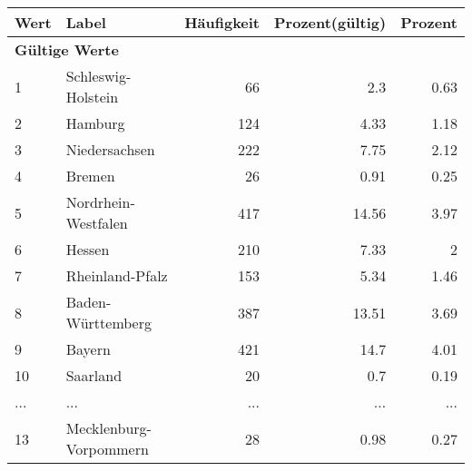      \begin{longtable}{lXrrr}
     \toprule
     \textbf{Wert} & \textbf{Label} & \textbf{Häufigkeit} & \textbf{Prozent(gültig)} & \textbf{Prozent} \\
     \endhead
     \midrule
     \multicolumn{5}{l}{\textbf{Gültige Werte}}\\
        1 & \multicolumn{1}{X}{Schleswig-Holstein} & %
          \num{66} &
          \num[round-mode=places,round-precision=2]{2.3} &
          \num[round-mode=places,round-precision=2]{0.63} \\
        2 & \multicolumn{1}{X}{Hamburg} & %
          \num{124} &
          \num[round-mode=places,round-precision=2]{4.33} &
          \num[round-mode=places,round-precision=2]{1.18} \\
        3 & \multicolumn{1}{X}{Niedersachsen} & %
          \num{222} &
          \num[round-mode=places,round-precision=2]{7.75} &
          \num[round-mode=places,round-precision=2]{2.12} \\
        4 & \multicolumn{1}{X}{Bremen} & %
          \num{26} &
          \num[round-mode=places,round-precision=2]{0.91} &
          \num[round-mode=places,round-precision=2]{0.25} \\
        5 & \multicolumn{1}{X}{Nordrhein-Westfalen} & %
          \num{417} &
          \num[round-mode=places,round-precision=2]{14.56} &
          \num[round-mode=places,round-precision=2]{3.97} \\
        6 & \multicolumn{1}{X}{Hessen} & %
          \num{210} &
          \num[round-mode=places,round-precision=2]{7.33} &
          \num[round-mode=places,round-precision=2]{2} \\
        7 & \multicolumn{1}{X}{Rheinland-Pfalz} & %
          \num{153} &
          \num[round-mode=places,round-precision=2]{5.34} &
          \num[round-mode=places,round-precision=2]{1.46} \\
        8 & \multicolumn{1}{X}{Baden-Württemberg} & %
          \num{387} &
          \num[round-mode=places,round-precision=2]{13.51} &
          \num[round-mode=places,round-precision=2]{3.69} \\
        9 & \multicolumn{1}{X}{Bayern} & %
          \num{421} &
          \num[round-mode=places,round-precision=2]{14.7} &
          \num[round-mode=places,round-precision=2]{4.01} \\
        10 & \multicolumn{1}{X}{Saarland} & %
          \num{20} &
          \num[round-mode=places,round-precision=2]{0.7} &
          \num[round-mode=places,round-precision=2]{0.19} \\
       ... & ... & ... & ... & ... \\
        13 & \multicolumn{1}{X}{Mecklenburg-Vorpommern} & %
          \num{28} &
          \num[round-mode=places,round-precision=2]{0.98} &
          \num[round-mode=places,round-precision=2]{0.27} \\


\end{longtable}
